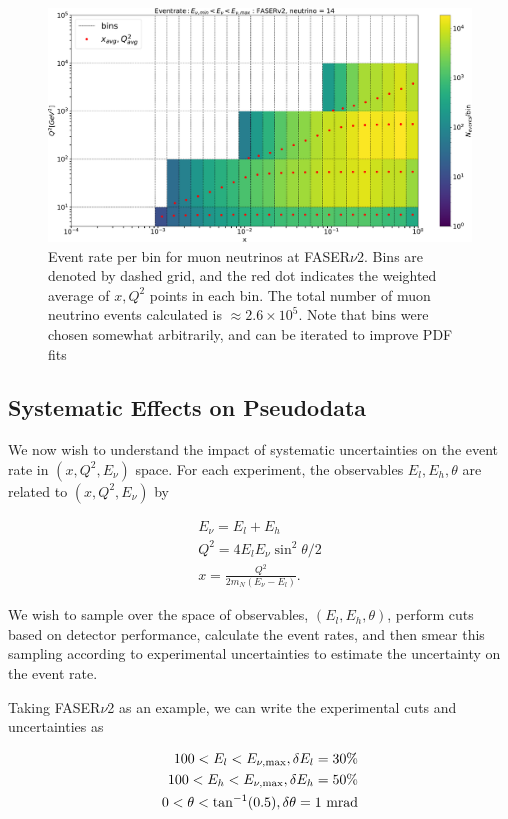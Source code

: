 \begin{figure}[h]
    \centering
\includegraphics[width=1\textwidth]{plots/Nevent_FASERv2_14.pdf}
    \caption{Event rate per bin for muon neutrinos at FASER$\nu$2. Bins are denoted by dashed grid, and the red dot indicates the weighted average of $x,Q^2$ points in each bin. The total number of muon neutrino events calculated is $\approx2.6\times 10^5$. Note that bins were chosen somewhat arbitrarily, and can be iterated to improve PDF fits }
    \label{fig:fasernu2_muon}
\end{figure}

\subsection{Systematic Effects on Pseudodata}
We now wish to understand the impact of systematic uncertainties on the event rate in $(x,Q^2,E_{\nu})$ space. For each experiment, the observables $E_{l},E_{h},\theta$ are related to $(x,Q^2,E_{\nu})$ by 

\begin{align}
E_{\nu} = E_l + E_h \nonumber \\
Q^2 = 4E_lE_{\nu}\sin^2{\theta/2} \nonumber \\
x = \frac{Q^2}{2m_N(E_{\nu} - E_l)}.
\end{align}

We wish to sample over the space of observables, $(E_{l},E_{h},\theta)$, perform  cuts based on detector performance, calculate the event rates, and then smear this sampling according to experimental uncertainties to estimate the uncertainty on the event rate. 

Taking FASER${\nu}$2 as an example, we can write the experimental cuts and uncertainties as 

\begin{align}
100 < E_l < E_{\nu,{\rm max}} , \delta E_l = 30\% \nonumber \\
100 < E_h < E_{\nu,{\rm max}} , \delta E_h = 50\% \nonumber \\
0 < \theta < \tan^{-1}(0.5) , \delta\theta = 1~{\rm mrad}
\label{fasernu2systematic_errors}
\end{align}

